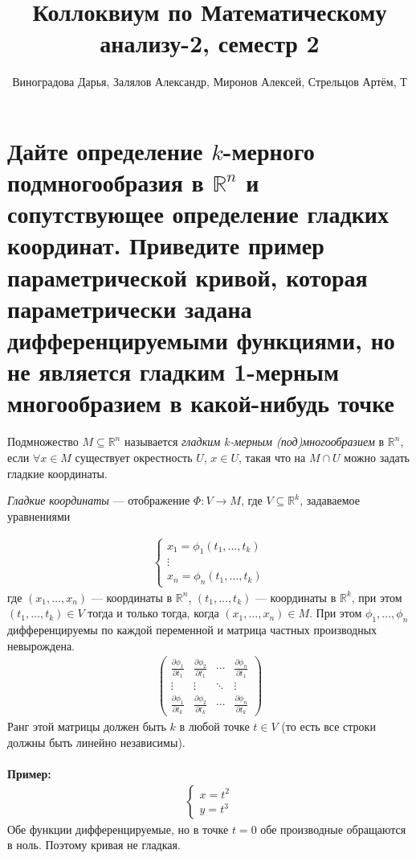 \documentclass{article}
\title{Коллоквиум по Математическому анализу-2, семестр 2}
\author{Виноградова Дарья, Залялов Александр, Миронов Алексей, Стрельцов Артём, Т}
\date{}
\begin{document}
	\maketitle

	\tableofcontents

	\clearpage


	\setcounter{section}{13}

	\section{Дайте определение $k$-мерного подмногообразия в $\mathbb{R}^n$ и сопутствующее определение гладких координат. Приведите пример параметрической кривой, которая параметрически задана дифференцируемыми функциями, но не является гладким 1-мерным многообразием в какой-нибудь точке}
\begin{definition}
	Подмножество $M\subseteq \mathbb{R}^n$ называется \textit{гладким $k$-мерным (под)многообразием} в $\mathbb{R}^n$, если $\forall x \in M$ существует окрестность $U$, $x\in U$, такая что на $M \cap U$ можно задать гладкие координаты.
\end{definition}
\begin{definition}
\textit{Гладкие координаты} --- отображение $\Phi: V \xrightarrow{} M$, где $V \subseteq \mathbb{R}^k$, задаваемое уравнениями
\end{definition}
\begin{gather*}
\begin{cases}
    x_1 = \phi_1(t_1, \dotsc, t_k)\\
    \vdots\\
    x_n = \phi_n(t_1, \dotsc, t_k)
\end{cases}
\end{gather*}
где $(x_1, \dotsc, x_n)$ --- координаты в $\mathbb{R}^n$, $(t_1, \dotsc, t_k)$ --- координаты в $\mathbb{R}^k$,
при этом $(t_1, \dotsc, t_k) \in V$ тогда и только тогда, когда $(x_1, \dotsc, x_n)\in M$. При этом $\phi_1,\dotsc,\phi_n$ дифференцируемы по каждой переменной и матрица частных производных невырождена.
\begin{gather*}
\begin{pmatrix}
\frac{\partial \phi_1}{\partial t_1} & \frac{\partial \phi_2}{\partial t_1} & \cdots & \frac{\partial \phi_n}{\partial t_1} \\
\vdots & \vdots & \ddots & \vdots \\
\frac{\partial \phi_1}{\partial t_k} & \frac{\partial \phi_2}{\partial t_k} & \cdots & \frac{\partial \phi_n}{\partial t_k}
\end{pmatrix}
\end{gather*}
Ранг этой матрицы должен быть $k$ в любой точке $t \in V$ (то есть все строки должны быть линейно независимы).
\\\\
\textbf{Пример:}
\begin{gather*}
\begin{cases}
    x=t^2\\
    y=t^3
\end{cases}
\end{gather*}
Обе функции дифференцируемые, но в точке $t=0$ обе производные обращаются в ноль. Поэтому кривая не гладкая.
\end{document}
